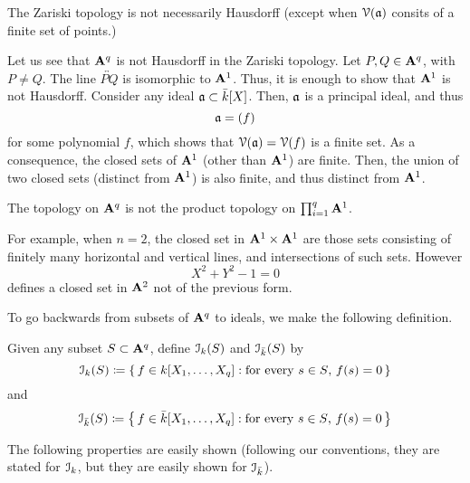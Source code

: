 The Zariski topology is not necessarily Hausdorff (except when $\mathcal{V}(\mathfrak{a})$
consits of a finite set of points.)

Let us see that $\mathbf{A}^q$ is not Hausdorff in the Zariski topology. Let
$P,Q\in\mathbf{A}^q$, with $P\neq Q$. The line $\overleftrightarrow{PQ}$ is
isomorphic to $\mathbf{A}^1$. Thus, it is enough to show that $\mathbf{A}^1$ is not
Hausdorff. Consider any ideal $\mathfrak{a}\subset\bar k[X]$. Then, $\mathfrak{a}$ is a
principal ideal, and thus
\[
\mathfrak{a}=(f)
\]
for some polynomial $f$, which shows that $\mathcal{V}(\mathfrak{a})=\mathcal{V}(f)$ is a finite
set. As a consequence, the closed sets of $\mathbf{A}^1$ (other than $\mathbf{A}^1$)
are finite. Then, the union of two closed sets (distinct from $\mathbf{A}^1$) is
also finite, and thus distinct from $\mathbf{A}^1$.

The topology on $\mathbf{A}^q$ is not the product topology on
$\prod_{i=1}^q\mathbf{A}^1$.

For example, when $n=2$, the closed set in $\mathbf{A}^1\times\mathbf{A}^1$ are those
sets consisting of finitely many horizontal and vertical lines, and
intersections of such sets. However
\[
X^2+Y^2-1=0
\]
defines a closed set in $\mathbf{A}^2$ not of the previous form.

To go backwards from subsets of $\mathbf{A}^q$ to ideals, we make the following
definition.
\begin{definition}
 Given any subset $S\subset\mathbf{A}^q$, define $\mathcal{I}_k(S)$ and $\mathcal{I}_{\bar
   k}(S)$ by
\[
\mathcal{I}_k(S)\coloneqq\left\{\,f\in k[X_1,\dotsc,X_q]:
\text{for every $s\in S$, $f(s)=0$}\,\right\}
\]
and
\[
\mathcal{I}_{\bar k}(S)\coloneqq\left\{\,f\in\bar k[X_1,\dotsc,X_q]:
\text{for every $s\in S$, $f(s)=0$}\,\right\}
\]
\end{definition}

The following properties are easily shown (following our conventions, they
are stated for $\mathcal{I}_k$, but they are easily shown for $\mathcal{I}_{\bar k}$).

